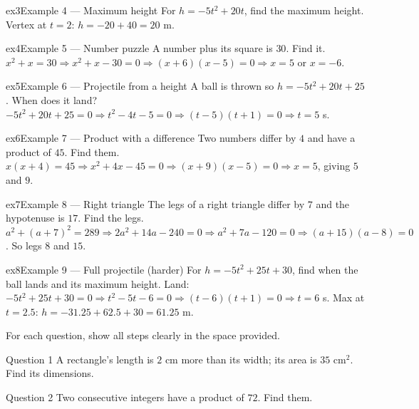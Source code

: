 \documentclass[11pt]{article}
\begin{document}
\begin{example}{ex3}{Example 4 --- Maximum height}
For $h=-5t^2+20t$, find the maximum height.
\soln Vertex at $t=2$: $h=-20+40=20$ m.
\end{example}

\begin{example}{ex4}{Example 5 --- Number puzzle}
A number plus its square is $30$. Find it.
\soln $x^2+x=30\Rightarrow x^2+x-30=0\Rightarrow (x+6)(x-5)=0\Rightarrow x=5$ or $x=-6.$
\end{example}

\begin{example}{ex5}{Example 6 --- Projectile from a height}
A ball is thrown so $h=-5t^2+20t+25$. When does it land?
\soln $-5t^2+20t+25=0\Rightarrow t^2-4t-5=0\Rightarrow (t-5)(t+1)=0\Rightarrow t=5$ s.
\end{example}

\begin{example}{ex6}{Example 7 --- Product with a difference}
Two numbers differ by $4$ and have a product of $45$. Find them.
\soln $x(x+4)=45\Rightarrow x^2+4x-45=0\Rightarrow (x+9)(x-5)=0\Rightarrow x=5$, giving $5$ and $9.$
\end{example}

\begin{example}{ex7}{Example 8 --- Right triangle}
The legs of a right triangle differ by $7$ and the hypotenuse is $17$. Find the legs.
\soln $a^2+(a+7)^2=289\Rightarrow 2a^2+14a-240=0\Rightarrow a^2+7a-120=0\Rightarrow (a+15)(a-8)=0$. So legs $8$ and $15.$
\end{example}

\begin{example}{ex8}{Example 9 --- Full projectile (harder)}
For $h=-5t^2+25t+30$, find when the ball lands and its maximum height.
\soln Land: $-5t^2+25t+30=0\Rightarrow t^2-5t-6=0\Rightarrow (t-6)(t+1)=0\Rightarrow t=6$ s. Max at $t=2.5$: $h=-31.25+62.5+30=61.25$ m.
\end{example}

\clearpage
{}
For each question, show all steps clearly in the space provided.

\begin{qbox}{Question 1}
A rectangle's length is $2$ cm more than its width; its area is $35$ cm$^2$. Find its dimensions.\workspace{2.6cm}
\end{qbox}

\begin{qbox}{Question 2}
Two consecutive integers have a product of $72$. Find them.\workspace{2.4cm}
\end{qbox}
\end{document}
